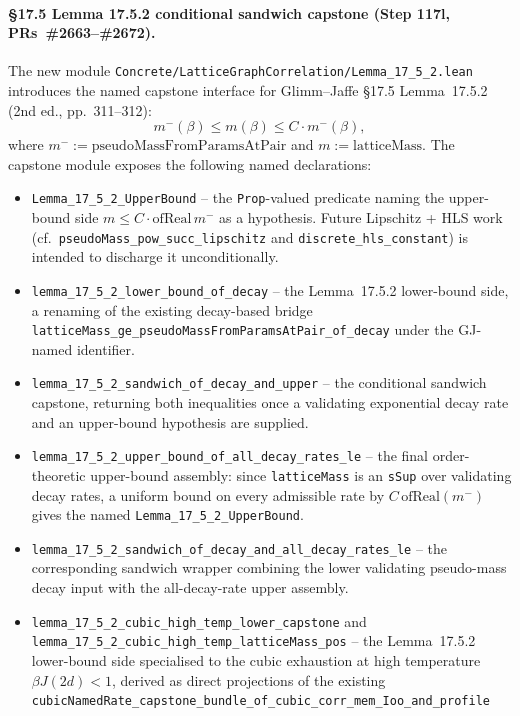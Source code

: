 \documentclass[a4paper,11pt]{article}
\begin{document}
\paragraph{\S17.5 Lemma 17.5.2 conditional sandwich capstone
(Step 117l, PRs~\#2663--\#2672).} The new module
\texttt{Concrete/LatticeGraphCorrelation/Lemma\_17\_5\_2.lean}
introduces the named capstone interface for
Glimm--Jaffe \S17.5 Lemma~17.5.2 (2nd ed., pp.~311--312):
\[
m^-(\beta) \le m(\beta) \le C \cdot m^-(\beta),
\]
where $m^- := \mathrm{pseudoMassFromParamsAtPair}$ and
$m := \mathrm{latticeMass}$.  The capstone module exposes the following named
declarations:
\begin{itemize}
\item \texttt{Lemma\_17\_5\_2\_UpperBound} -- the \texttt{Prop}-valued
  predicate naming the upper-bound side
  $m \le C \cdot \mathrm{ofReal}\,m^-$ as a hypothesis.  Future
  Lipschitz + HLS work (cf.\ \texttt{pseudoMass\_pow\_succ\_lipschitz}
  and \texttt{discrete\_hls\_constant}) is intended to discharge it
  unconditionally.
\item \texttt{lemma\_17\_5\_2\_lower\_bound\_of\_decay} -- the
  Lemma~17.5.2 lower-bound side, a renaming of the existing decay-based
  bridge \texttt{latticeMass\_ge\_pseudoMassFromParamsAtPair\_of\_decay}
  under the GJ-named identifier.
\item \texttt{lemma\_17\_5\_2\_sandwich\_of\_decay\_and\_upper} -- the
  conditional sandwich capstone, returning both inequalities once a
  validating exponential decay rate and an upper-bound hypothesis are
  supplied.
\item \texttt{lemma\_17\_5\_2\_upper\_bound\_of\_all\_decay\_rates\_le} --
  the final order-theoretic upper-bound assembly: since
  \texttt{latticeMass} is an \texttt{sSup} over validating decay rates, a
  uniform bound on every admissible rate by $C\,\mathrm{ofReal}(m^-)$ gives
  the named \texttt{Lemma\_17\_5\_2\_UpperBound}.
\item \texttt{lemma\_17\_5\_2\_sandwich\_of\_decay\_and\_all\_decay\_rates\_le}
  -- the corresponding sandwich wrapper combining the lower validating
  pseudo-mass decay input with the all-decay-rate upper assembly.
\item \texttt{lemma\_17\_5\_2\_cubic\_high\_temp\_lower\_capstone} and
  \texttt{lemma\_17\_5\_2\_cubic\_high\_temp\_latticeMass\_pos} -- the
  Lemma~17.5.2 lower-bound side specialised to the cubic exhaustion at
  high temperature $\beta J (2d) < 1$, derived as direct projections
  of the existing
  \texttt{cubicNamedRate\_capstone\_bundle\_of\_cubic\_corr\_mem\_Ioo\_and\_profile}

\end{itemize}
\end{document}
